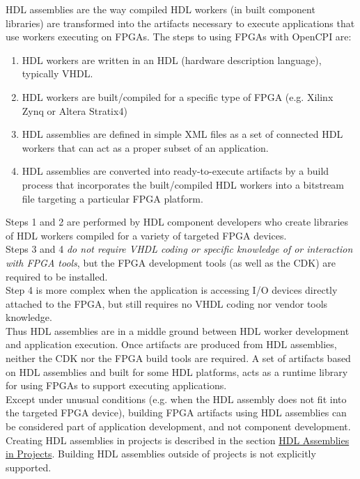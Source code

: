 \documentclass[10pt, a4paper, oneside]{article}
\renewcommand\_{\textunderscore\allowbreak} %
\begin{document}
HDL assemblies are the way compiled HDL workers (in built component libraries) are transformed into the artifacts necessary to execute applications that use workers executing on FPGAs.  The steps to using FPGAs with OpenCPI are:
\begin{enumerate}
\item HDL workers are written in an HDL (hardware description language), typically VHDL.
\item HDL workers are built/compiled for a specific type of FPGA (e.g. Xilinx Zynq or Altera Stratix4)
\item HDL assemblies are defined in simple XML files as a set of connected HDL workers that can act as a proper subset of an application.
\item HDL assemblies are converted into ready-to-execute artifacts by a build process that incorporates the built/compiled HDL workers into a bitstream file targeting a particular FPGA platform.
\end{enumerate}
Steps 1 and 2 are performed by HDL component developers who create libraries of HDL workers compiled for a variety of targeted FPGA devices.\\

Steps 3 and 4 \emph{do not require VHDL coding or specific knowledge of or interaction with FPGA tools}, but the FPGA development tools (as well as the CDK) are required to be installed. \\

Step 4 is more complex when the application is accessing I/O devices directly attached to the FPGA, but still requires no VHDL coding nor vendor tools knowledge.\\

Thus HDL assemblies are in a middle ground between HDL worker development and application execution.  Once artifacts are produced from HDL assemblies, neither the CDK nor the FPGA build tools are required. A set of artifacts based on HDL assemblies and built for some HDL platforms, acts as a runtime library for using FPGAs to support executing applications. \\

Except under unusual conditions (e.g. when the HDL assembly does not fit into the targeted FPGA device), building FPGA artifacts using HDL assemblies can be considered part of application development, and not component development.\\

Creating HDL assemblies in projects is described in the section \hyperlink{HDL Assemblies in Projects} {HDL Assemblies in Projects}. Building HDL assemblies outside of projects is not explicitly supported. \\
\end{document}
